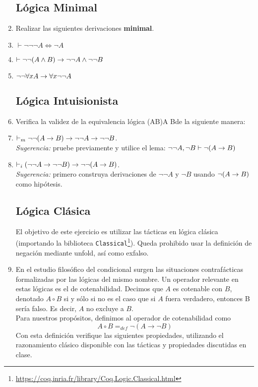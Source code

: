 \documentclass[letterpaper, 11 pt]{article}
\begin{document}
\begin{enumerate}
\subsection*{Lógica Minimal}
\item Realizar las siguientes derivaciones {\bf
    minimal}.
  \be
  \item $\vdash \neg\neg\neg A \iff \neg A$
  \item      $\vdash \neg\neg(A\land B)\rightarrow \neg\neg
   A\land\neg\neg B$
  \item $\neg\neg\forall x A\rightarrow \forall x \neg\neg A$
   \ee
   
\subsection*{Lógica Intuisionista}
 \item Verifica la validez de la
   equivalencia lógica \beqs\neg\neg(A\imp B)\iff \neg\neg A\imp\neg\neg
   B\eeqs de la siguiente manera:
   \be
    \item $\vdash_{m} \neg\neg(A\rightarrow B)\rightarrow\neg\neg A\rightarrow\neg\neg
   B$. \\ \emph{Sugerencia:} pruebe previamente y utilice el lema: 
   $\neg\neg A,\neg B\vdash \neg (A\rightarrow B)$
       \item $\vdash_{i}(\neg\neg A\rightarrow\neg\neg
   B)\rightarrow\neg\neg(A\rightarrow B)$. \\ \emph{Sugerencia:} primero construya
   derivaciones de $\neg\neg A$ y $\neg B$ usando $\neg(A\rightarrow B)$ como
   hipótesis.
    \ee

\subsection*{Lógica Clásica}

El objetivo de este ejercicio es utilizar las tácticas en lógica clásica (importando la biblioteca {\tt Classical}\footnote{\url{https://coq.inria.fr/library/Coq.Logic.Classical.html}}). Queda prohibido usar la definición de negación mediante unfold, así como exfalso.

\item En el estudio filosófico del condicional surgen las situaciones
contrafácticas formalizadas por las lógicas del mismo nombre. Un operador
relevante en estas lógicas es el de cotenabilidad. Decimos que $A$ es
cotenable con $B$, denotado $A\circ B$ si y sólo si no es el caso que si $A$
fuera verdadero, entonces B sería falso. Es decir, $A$ no excluye a $B$. \\
Para nuestros propósitos, definimos al operador de cotenabilidad como
\[
A\circ B =_{def} \neg (A\to \neg B)
\] 
Con esta definición verifique las siguientes propiedades, utilizando el razonamiento clásico disponible con las tácticas
y propiedades discutidas en clase.


\end{enumerate}
\end{document}

